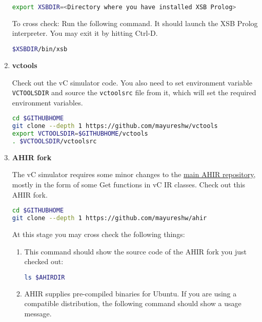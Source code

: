 \documentclass[12pt,a4paper]{article}
\begin{document}
\begin{enumerate}
\begin{lstlisting}[language=bash,style=snippet]
export XSBDIR=<Directory where you have installed XSB Prolog>
\end{lstlisting}

To cross check: Run the following command. It should launch the XSB Prolog interpreter. You may exit it by hitting Ctrl-D.

\begin{lstlisting}[language=bash,style=snippet]
$XSBDIR/bin/xsb
\end{lstlisting}

\item \textbf{vctools}

Check out the vC simulator code. You also need to set environment variable \texttt{VCTOOLSDIR} and source the \texttt{vctoolsrc} file from it, which will set the required environment variables.

\begin{lstlisting}[language=bash,style=snippet]
cd $GITHUBHOME
git clone --depth 1 https://github.com/mayureshw/vctools
export VCTOOLSDIR=$GITHUBHOME/vctools
. $VCTOOLSDIR/vctoolsrc
\end{lstlisting}

\item \textbf{AHIR fork}

The vC simulator requires some minor changes to the \href{https://github.com/madhavPdesai/ahir}{main AHIR repository}, mostly in the form of some Get functions in vC IR classes. Check out this AHIR fork.

\begin{lstlisting}[language=bash,style=snippet]
cd $GITHUBHOME
git clone --depth 1 https://github.com/mayureshw/ahir
\end{lstlisting}

At this stage you may cross check the following things:

\begin{enumerate}
\item This command should show the source code of the AHIR fork you just checked out:

\begin{lstlisting}[language=bash,style=snippet]
ls $AHIRDIR
\end{lstlisting}

\item AHIR supplies pre-compiled binaries for Ubuntu. If you are using a compatible distribution, the following command should show a usage message.


\end{enumerate}
\end{enumerate}
\end{document}
